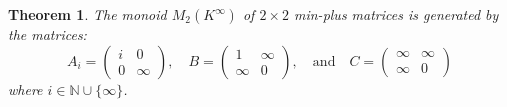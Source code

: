 \documentclass{amsart}
\newcommand{\N}{\mathbb{N}}
\numberwithin{equation}{section}
\newtheorem{thm}[equation]{Theorem}
\theoremstyle{definition}
\begin{document}
\begin{thm}
  \label{thm-min-plus}
  The monoid $M_2(K^{\infty})$ of $2 \times 2$ min-plus matrices is
  generated by the matrices:
  \begin{equation*}
    A_i = 
    \begin{pmatrix}
      i & 0      \\
      0 & \infty
    \end{pmatrix},
    \quad
    B = 
    \begin{pmatrix}
      1      & \infty \\
      \infty & 0
    \end{pmatrix},
    \quad 
    \text{and}
    \quad
    C = 
    \begin{pmatrix}
      \infty & \infty \\
      \infty & 0
    \end{pmatrix}
  \end{equation*}
  where $i\in \N\cup \{\infty\}$.
\end{thm}
\end{document}
